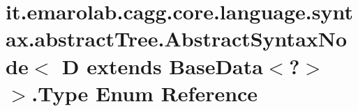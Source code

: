\hypertarget{enumit_1_1emarolab_1_1cagg_1_1core_1_1language_1_1syntax_1_1abstractTree_1_1AbstractSyntaxNode_3f088e462016145511ce70dc364c19523}{\section{it.\-emarolab.\-cagg.\-core.\-language.\-syntax.\-abstract\-Tree.\-Abstract\-Syntax\-Node$<$ D extends Base\-Data$<$?$>$ $>$.Type Enum Reference}
\label{enumit_1_1emarolab_1_1cagg_1_1core_1_1language_1_1syntax_1_1abstractTree_1_1AbstractSyntaxNode_3f088e462016145511ce70dc364c19523}
}
